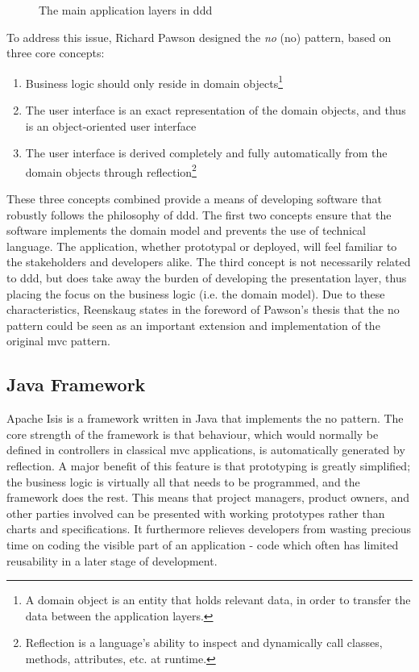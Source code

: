 \begin{figure}[h]
	\center
	
	\caption{The main application layers in \acrshort{ddd}}
	\label{figure:applicationlayers}
\end{figure}

To address this issue, Richard Pawson designed the \textit{\acrlong{no}} (\acrshort{no}) pattern, based on three core concepts\cite{pawson2002naked}:
\begin{enumerate}
	\item Business logic should only reside in domain objects\footnote{A domain object is an entity that holds relevant data, in order to transfer the data between the application layers.}
	
	\item The user interface is an exact representation of the domain objects, and thus is an object-oriented user interface
	
	\item The user interface is derived completely and fully automatically from the domain objects through reflection\footnote{Reflection is a language's ability to inspect and dynamically call classes, methods, attributes, etc. at runtime.}
\end{enumerate}

These three concepts combined provide a means of developing software that robustly follows the philosophy of \acrshort{ddd}. The first two concepts ensure that the software implements the domain model and prevents the use of technical language. The application, whether prototypal or deployed, will feel familiar to the stakeholders and developers alike. The third concept is not necessarily related to \acrshort{ddd}, but does take away the burden of developing the presentation layer, thus placing the focus on the business logic (i.e. the domain model). Due to these characteristics, Reenskaug states in the foreword of Pawson's thesis that the \acrshort{no} pattern could be seen as an important extension and implementation of the original \acrshort{mvc} pattern.

\subsection{Java Framework}
\label{subsection:javaframework}
Apache Isis is a framework written in Java that implements the \acrshort{no} pattern. The core strength of the framework is that behaviour, which would normally be defined in controllers in classical \acrshort{mvc} applications, is automatically generated by reflection. A major benefit of this feature is that prototyping is greatly simplified; the business logic is virtually all that needs to be programmed, and the framework does the rest. This means that project managers, product owners, and other parties involved can be presented with working prototypes rather than charts and specifications. It furthermore relieves developers from wasting precious time on coding the visible part of an application - code which often has limited reusability in a later stage of development.

